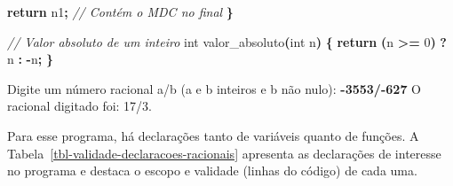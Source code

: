 \documentclass[
  11pt,
  a4paper,
]{scrbook}
\newenvironment{Shaded}{\begin{snugshade}}{\end{snugshade}}
\newcommand{\CommentTok}[1]{\textcolor[rgb]{0.56,0.35,0.01}{\textit{#1}}}
\newcommand{\ControlFlowTok}[1]{\textcolor[rgb]{0.13,0.29,0.53}{\textbf{#1}}}
\newcommand{\DataTypeTok}[1]{\textcolor[rgb]{0.13,0.29,0.53}{#1}}
\newcommand{\DecValTok}[1]{\textcolor[rgb]{0.00,0.00,0.81}{#1}}
\newcommand{\KeywordTok}[1]{\textcolor[rgb]{0.13,0.29,0.53}{\textbf{#1}}}
\newcommand{\NormalTok}[1]{#1}
\newcommand{\OperatorTok}[1]{\textcolor[rgb]{0.81,0.36,0.00}{\textbf{#1}}}
\begin{document}
\begin{Shaded}
\begin{Highlighting}[numbers=left,,]
    \ControlFlowTok{return}\NormalTok{ n1}\OperatorTok{;}  \CommentTok{// Contém o MDC no final}
\OperatorTok{\}}

\CommentTok{// Valor absoluto de um inteiro}
\DataTypeTok{int}\NormalTok{ valor\_absoluto}\OperatorTok{(}\DataTypeTok{int}\NormalTok{ n}\OperatorTok{)} \OperatorTok{\{}
    \ControlFlowTok{return} \OperatorTok{(}\NormalTok{n }\OperatorTok{\textgreater{}=} \DecValTok{0}\OperatorTok{)} \OperatorTok{?}\NormalTok{ n }\OperatorTok{:} \OperatorTok{{-}}\NormalTok{n}\OperatorTok{;}
\OperatorTok{\}}
\end{Highlighting}
\end{Shaded}

\begin{Shaded}
\begin{Highlighting}[]
\NormalTok{Digite um número racional a/b (a e b inteiros e b não nulo): }\KeywordTok{ {-}3553/{-}627 }
\NormalTok{O racional digitado foi: 17/3.}
\end{Highlighting}
\end{Shaded}

Para esse programa, há declarações tanto de variáveis quanto de funções.
A Tabela~\ref{tbl-validade-declaracoes-racionais} apresenta as
declarações de interesse no programa e destaca o escopo e validade
(linhas do código) de cada uma.
\end{document}
